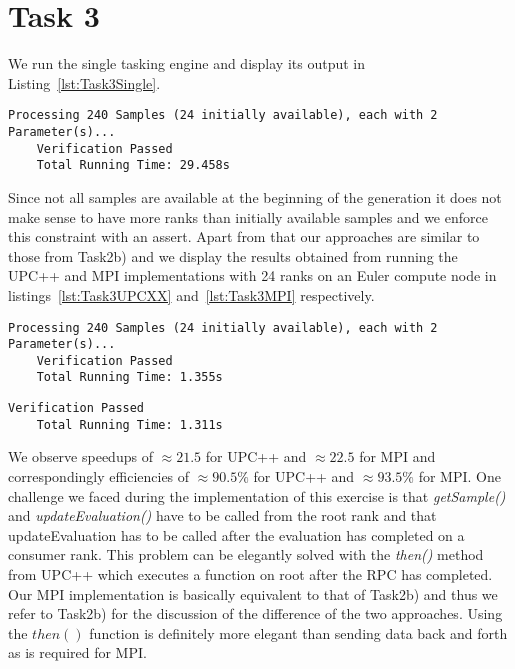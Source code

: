 \documentclass[11pt]{article}
\begin{document}
    \section*{Task 3}
    \label{sec:Task3}

    We run the single tasking engine and display its output in
    Listing~\ref{lst:Task3Single}.

    \begin{lstlisting}[basicstyle=\tiny, frame=single, caption={Output from
    executing the single tasking engine.}, label={lst:Task3Single}]
    Processing 240 Samples (24 initially available), each with 2 Parameter(s)...
    Verification Passed
    Total Running Time: 29.458s
    \end{lstlisting}

    Since not all samples are available at the beginning of the generation
    it does not make sense to have more ranks than initially available
    samples and we enforce this constraint with an assert.
    Apart from that our approaches are similar to those from Task2b) and we
    display the results obtained from running the UPC++ and MPI
    implementations with 24 ranks on an Euler compute node in
    listings~\ref{lst:Task3UPCXX} and~\ref{lst:Task3MPI} respectively.

    \begin{lstlisting}[basicstyle=\tiny, frame=single, caption={Output from
    executing the UPC++ tasking engine .},
    label={lst:Task3UPCXX}]
    Processing 240 Samples (24 initially available), each with 2 Parameter(s)...
    Verification Passed
    Total Running Time: 1.355s
    \end{lstlisting}

    \begin{lstlisting}[basicstyle=\tiny, frame=single, caption={Output from
    executing the MPI tasking engine .},
    label={lst:Task3MPI}]
    Verification Passed
    Total Running Time: 1.311s
    \end{lstlisting}

    We observe speedups of $\approx 21.5$ for UPC++ and $\approx 22.5$ for
    MPI and correspondingly efficiencies of $\approx 90.5\%$ for UPC++ and
    $\approx 93.5\%$ for MPI.\@
    One challenge we faced during the implementation of this exercise is
    that \mbox{\textit{getSample()}} and \mbox{\textit{updateEvaluation()}}
    have to be called from the root rank and that updateEvaluation has to be
    called after the evaluation has completed on a consumer rank.
    This problem can be elegantly solved with the \textit{then()} method
    from UPC++ which executes a function on root after the RPC has completed.
    Our MPI implementation is basically equivalent to that of Task2b) and
    thus we refer to Task2b) for the discussion of the difference of the two
    approaches.
    Using the $then()$ function is definitely more elegant than sending data
    back and forth as is required for MPI.\@
\end{document}
